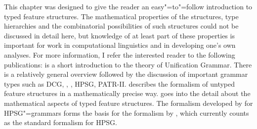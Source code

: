 This chapter was designed to give the reader an easy"=to"=follow introduction to typed feature structures. The mathematical properties of the structures, type hierarchies and the
combinatorial possibilities of such structures could not be discussed in detail here, but knowledge of
at least part of these properties is important for work in computational linguistics and in
developing one's own analyses. For more information, I refer the interested reader to the following publications: 
%
\citet{Shieber86a} is a short introduction to the theory of Unification Grammar. There is a relatively general overview followed by the discussion of important grammar types
such as DCG, \lfg, \gpsg,
HPSG, PATR-II.
%
\citet{Johnson88} describes the formalism of untyped feature structures in a mathematically precise way.
%
\citet{Carpenter92a} goes into the detail about the mathematical aspects of typed feature structures. The formalism developed by \citet{King99a-u} for HPSG"=grammars forms the basis
for the formalism by \citet{Richter2004a-u}, which currently counts as the standard formalism for HPSG.


